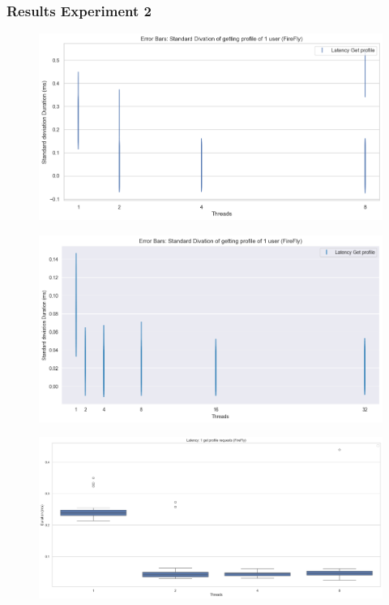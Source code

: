 \documentclass[a4paper]{article}
\begin{document}
\subsubsection{Results Experiment 2}
\begin{figure}[H]
	\centering
	\includegraphics[width = \linewidth]{Images/LatencyStdFirefly.png}
	\caption{}
\end{figure}
\begin{figure}[H]
	\centering
	\includegraphics[width = \linewidth]{Images/LatencyStd.png}
	\caption{}
\end{figure}
\begin{figure}[H]
	\centering
	\includegraphics[width = \linewidth]{Images/LatencyBoxFirefly.png}
	\caption{}
\end{figure}
\end{document}
